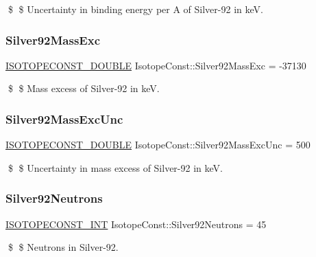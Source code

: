 \$ \$ Uncertainty in binding energy per A of Silver-\/92 in keV. \mbox{\label{group___isotope_const-_silver-_ag92_ga8f42afbd7dbcec1ed8760d89ba3544e4}} 
\subsubsection{\texorpdfstring{Silver92\+Mass\+Exc}{Silver92MassExc}}
{\footnotesize\ttfamily \mbox{\hyperlink{group___isotope_const-_macros_ga8f45a7272ce02c0b4c65c44636ed719a}{I\+S\+O\+T\+O\+P\+E\+C\+O\+N\+S\+T\+\_\+\+D\+O\+U\+B\+LE}} Isotope\+Const\+::\+Silver92\+Mass\+Exc = -\/37130}

\$ \$ Mass excess of Silver-\/92 in keV. \mbox{\label{group___isotope_const-_silver-_ag92_ga11260f2ce12b207c0b65259012f80c1a}} 
\subsubsection{\texorpdfstring{Silver92\+Mass\+Exc\+Unc}{Silver92MassExcUnc}}
{\footnotesize\ttfamily \mbox{\hyperlink{group___isotope_const-_macros_ga8f45a7272ce02c0b4c65c44636ed719a}{I\+S\+O\+T\+O\+P\+E\+C\+O\+N\+S\+T\+\_\+\+D\+O\+U\+B\+LE}} Isotope\+Const\+::\+Silver92\+Mass\+Exc\+Unc = 500}

\$ \$ Uncertainty in mass excess of Silver-\/92 in keV. \mbox{\label{group___isotope_const-_silver-_ag92_ga974abe7f28b8a3e3806d9ccebf78e8b6}} 
\subsubsection{\texorpdfstring{Silver92\+Neutrons}{Silver92Neutrons}}
{\footnotesize\ttfamily \mbox{\hyperlink{group___isotope_const-_macros_ga5f18360b3e99483a35c32d789e62621c}{I\+S\+O\+T\+O\+P\+E\+C\+O\+N\+S\+T\+\_\+\+I\+NT}} Isotope\+Const\+::\+Silver92\+Neutrons = 45}

\$ \$ Neutrons in Silver-\/92. \mbox{\label{group___isotope_const-_silver-_ag92_gaa9c700e79ccc202692b96ed9ccc3058a}} 
